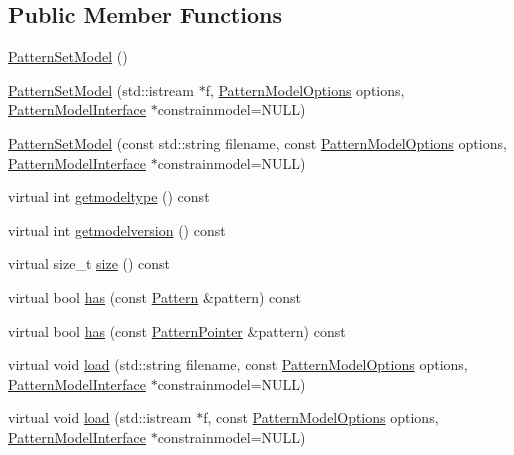 \subsection*{Public Member Functions}
\begin{DoxyCompactItemize}
\item 
\hyperlink{classPatternSetModel_a983877848beaf832f41f747231e1bf6f}{Pattern\+Set\+Model} ()
\item 
\hyperlink{classPatternSetModel_aecf0741defc687aff8e69514742c697d}{Pattern\+Set\+Model} (std\+::istream $\ast$f, \hyperlink{classPatternModelOptions}{Pattern\+Model\+Options} options, \hyperlink{classPatternModelInterface}{Pattern\+Model\+Interface} $\ast$constrainmodel=N\+U\+L\+L)
\item 
\hyperlink{classPatternSetModel_add4a2435685baf51852eb2fc55cbdc35}{Pattern\+Set\+Model} (const std\+::string filename, const \hyperlink{classPatternModelOptions}{Pattern\+Model\+Options} options, \hyperlink{classPatternModelInterface}{Pattern\+Model\+Interface} $\ast$constrainmodel=N\+U\+L\+L)
\item 
virtual int \hyperlink{classPatternSetModel_a27adf3033f15f03e908d53d032779d09}{getmodeltype} () const 
\item 
virtual int \hyperlink{classPatternSetModel_a79dc7fd04e3de5eb894541bd664f5d12}{getmodelversion} () const 
\item 
virtual size\+\_\+t \hyperlink{classPatternSetModel_aa19ae308dbc4bf1db35be6ba7ff4769b}{size} () const 
\item 
virtual bool \hyperlink{classPatternSetModel_a8821cf7c6d469d0978e32e5ed9cfcda0}{has} (const \hyperlink{classPattern}{Pattern} \&pattern) const 
\item 
virtual bool \hyperlink{classPatternSetModel_a2fcd4d3d1023b5e20f67d2b845a29b2f}{has} (const \hyperlink{classPatternPointer}{Pattern\+Pointer} \&pattern) const 
\item 
virtual void \hyperlink{classPatternSetModel_a04080c0e0ce176b5c53f0c1e8cdf5519}{load} (std\+::string filename, const \hyperlink{classPatternModelOptions}{Pattern\+Model\+Options} options, \hyperlink{classPatternModelInterface}{Pattern\+Model\+Interface} $\ast$constrainmodel=N\+U\+L\+L)
\item 
virtual void \hyperlink{classPatternSetModel_aa77fa04be083535b7c8c5dd6f0ca07b7}{load} (std\+::istream $\ast$f, const \hyperlink{classPatternModelOptions}{Pattern\+Model\+Options} options, \hyperlink{classPatternModelInterface}{Pattern\+Model\+Interface} $\ast$constrainmodel=N\+U\+L\+L)
\item 

\end{DoxyCompactItemize}
